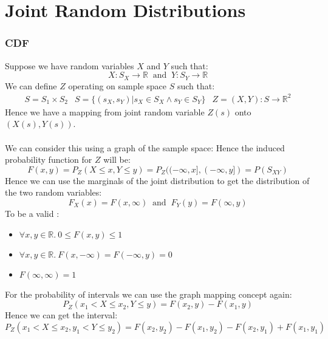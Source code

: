 \chapter{Joint Random Distributions}

\subsection{CDF}
Suppose we have random variables $X$ and $Y$ such that:
\[X: S_X \to \mathbb{R} \ \text{ and } \ Y: S_Y \to \mathbb{R}\]
We can define $Z$ operating on sample space $S$ such that:
\[\begin{matrix}
		S = S_1 \times S_2 & S = \{(s_X, s_Y) | s_X \in S_X \land s_Y \in S_Y\} & Z = (X, Y): S \to \mathbb{R}^2
	\end{matrix}\]
Hence we have a mapping from joint random variable $Z(s)$ onto $(X(s), Y(s))$.
\\
\\ We can consider this using a graph of the sample space:
Hence the induced probability function for $Z$ will be:
\[F(x,y) = P_Z(X \leq x, Y \leq y) = P_Z((-\infty, x], (- \infty, y]) = P(S_{XY})\]
Hence we can use the marginals of the joint distribution to get the distribution of the two random variables:
\[F_X(x) = F(x, \infty) \ \text{ and } \ F_Y(y) = F(\infty, y)\]
To be a valid :
\begin{itemize}
\item $\forall x,y \in \mathbb{R}. \ 0 \leq F(x,y) \leq 1$
\item $\forall x,y \in \mathbb{R}. \ F(x, -\infty) = F(-\infty, y) = 0$
\item $F(\infty, \infty) = 1$
\end{itemize}

For the probability of intervals we can use the graph mapping concept again:
\[P_Z(x_1 < X \leq x_2, Y \leq y) = F(x_2, y) - F(x_1, y)\]
Hence we can get the interval:
\[P_Z(x_1 < X \leq x_2, y_1 < Y \leq y_2) = F(x_2, y_2) - F(x_1, y_2) -F(x_2,y_1) + F(x_1,y_1)\]

